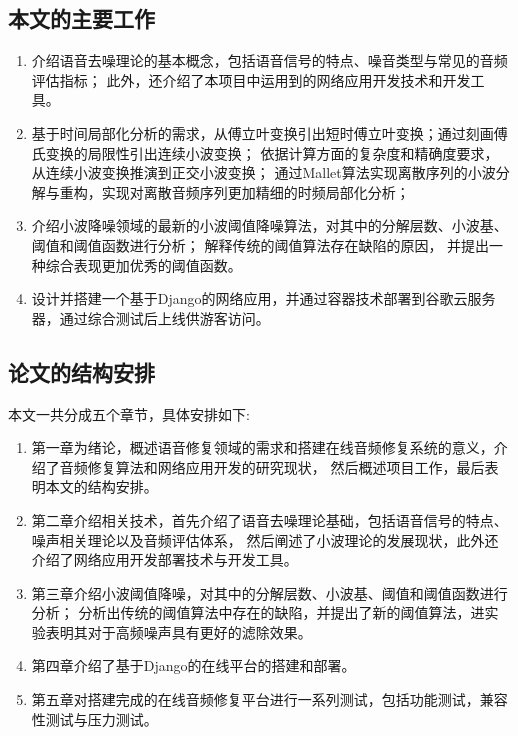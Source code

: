 \documentclass{morningstar}
\begin{document}
\subsection{本文的主要工作}

\begin{enumerate}

    \item 介绍语音去噪理论的基本概念，包括语音信号的特点、噪音类型与常见的音频评估指标；
    此外，还介绍了本项目中运用到的网络应用开发技术和开发工具。
    
    \item 基于时间局部化分析的需求，从傅立叶变换引出短时傅立叶变换；通过刻画傅氏变换的局限性引出连续小波变换；
    依据计算方面的复杂度和精确度要求，从连续小波变换推演到正交小波变换；
    通过Mallet算法实现离散序列的小波分解与重构，实现对离散音频序列更加精细的时频局部化分析；
    
    \item 介绍小波降噪领域的最新的小波阈值降噪算法，对其中的分解层数、小波基、阈值和阈值函数进行分析；
    解释传统的阈值算法存在缺陷的原因，
    并提出一种综合表现更加优秀的阈值函数。
    
    \item 设计并搭建一个基于Django的网络应用，并通过容器技术部署到谷歌云服务器，通过综合测试后上线供游客访问。
    
\end{enumerate}

\subsection{论文的结构安排}
本文一共分成五个章节，具体安排如下:
\begin{enumerate}
\item 第一章为绪论，概述语音修复领域的需求和搭建在线音频修复系统的意义，介绍了音频修复算法和网络应用开发的研究现状，
然后概述项目工作，最后表明本文的结构安排。

\item 第二章介绍相关技术，首先介绍了语音去噪理论基础，包括语音信号的特点、噪声相关理论以及音频评估体系，
然后阐述了小波理论的发展现状，此外还介绍了网络应用开发部署技术与开发工具。

\item 第三章介绍小波阈值降噪，对其中的分解层数、小波基、阈值和阈值函数进行分析；
分析出传统的阈值算法中存在的缺陷，并提出了新的阈值算法，进实验表明其对于高频噪声具有更好的滤除效果。

\item 第四章介绍了基于Django的在线平台的搭建和部署。

\item 第五章对搭建完成的在线音频修复平台进行一系列测试，包括功能测试，兼容性测试与压力测试。

\end{enumerate}
\end{document}
